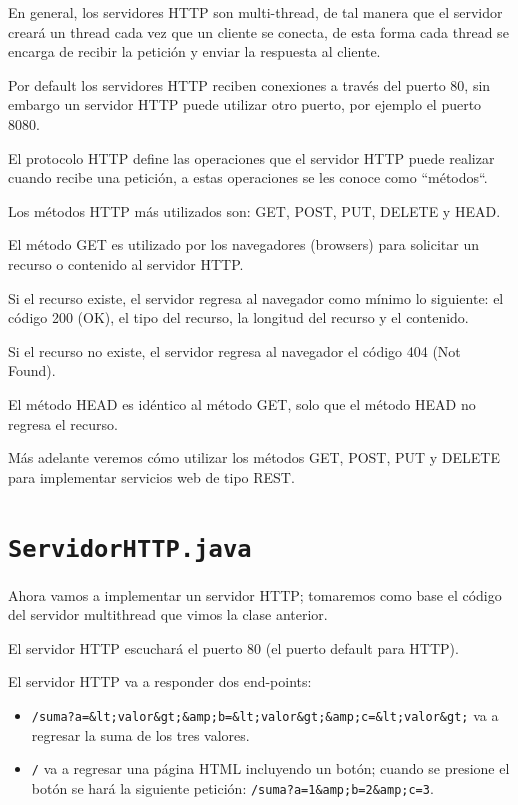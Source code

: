 \documentclass[11pt,a4paper,oneside]{book}
\begin{document}
En general, los servidores HTTP son multi-thread, de tal manera que el servidor creará un thread cada vez que un cliente se conecta, de esta forma cada thread se encarga de recibir la petición y enviar la respuesta al cliente.

Por default los servidores HTTP reciben conexiones a través del puerto 80, sin embargo un servidor HTTP puede utilizar otro puerto, por ejemplo el puerto 8080.

El protocolo HTTP define las operaciones que el servidor HTTP puede realizar cuando recibe una petición, a estas operaciones se les conoce como ``métodos``.

Los métodos HTTP más utilizados son: GET, POST, PUT, DELETE y HEAD.

El método GET es utilizado por los navegadores (browsers) para solicitar un recurso o contenido al servidor HTTP.

Si el recurso existe, el servidor regresa al navegador como mínimo lo siguiente: el código 200 (OK), el tipo del recurso, la longitud del recurso y el contenido.

Si el recurso no existe, el servidor regresa al navegador el código 404 (Not Found).

El método HEAD es idéntico al método GET, solo que el método HEAD no regresa el recurso.

Más adelante veremos cómo utilizar los métodos GET, POST, PUT y DELETE para implementar servicios web de tipo REST.

\section{\texttt{ServidorHTTP.java}}

Ahora vamos a implementar un servidor HTTP; tomaremos como base el código del servidor multithread que vimos la clase anterior.

El servidor HTTP escuchará el puerto 80 (el puerto default para HTTP).

El servidor HTTP va a responder dos end-points:

\begin{itemize}

\item \texttt{/suma?a=\&lt;valor\&gt;\&amp;b=\&lt;valor\&gt;\&amp;c=\&lt;valor\&gt;} va a regresar la suma de los tres valores.

\item \texttt{/} va a regresar una página HTML incluyendo un botón; cuando se presione el botón se hará la siguiente petición: \texttt{/suma?a=1\&amp;b=2\&amp;c=3}.

\end{itemize}
\end{document}
